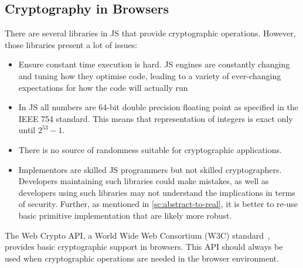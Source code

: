 \subsection{Cryptography in Browsers}\label{sc:webcrypto-api}

There are several libraries in JS that provide cryptographic
operations.
However, those libraries present a lot of issues:
\begin{itemize}
    \item Ensure constant time execution is hard. JS engines are constantly changing and tuning how they optimise code, leading to a variety of ever-changing expectations for how the code will actually run
    \item In JS all numbers are 64-bit double precision floating point as specified in the IEEE 754 standard. This means that representation of integers is exact only until $2^{53} - 1$.
    \item There is no source of randomness suitable for cryptographic applications.
    \item Implementors are skilled JS programmers but not skilled cryptographers. Developers maintaining such libraries could make mistakes, as well as developers using such libraries may not understand the implications in terms of security. Further, as mentioned in \cref{sc:abstract-to-real}, it is better to re-use basic primitive implementation that are likely more robust. 
\end{itemize}

The Web Crypto API, a World Wide Web Consortium (W3C) standard~\cite{WebCryptoAPISpecification}, 
provides basic cryptographic support in browsers. This API should
always be used when cryptographic operations are needed in the browser
environment.

